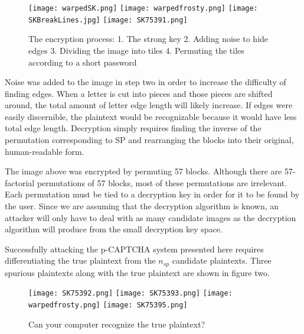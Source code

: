 \documentclass[12pt]{article}
\begin{document}
\begin{figure}
	\texttt{[image: warpedSK.png]}
	\texttt{[image: warpedfrosty.png]}
	\texttt{[image: SKBreakLines.jpg]}
	\texttt{[image: SK75391.png]}
	\caption{The encryption process: 1. The strong key 2. Adding noise to hide edges 3. Dividing the image into tiles 4. Permuting the tiles according to a short password}
\label{EncryptionProcess}
\end{figure}


	Noise was added to the image in step two in order to increase the difficulty of finding edges. When a letter is cut into pieces and those pieces are shifted around, the total amount of letter edge length will likely increase. If edges were easily discernible, the plaintext would be recognizable because it would have less total edge length. Decryption simply requires finding the inverse of the permutation corresponding to SP and rearranging the blocks into their original, human-readable form.

	The image above was encrypted by permuting 57 blocks. Although there are 57-factorial permutations of 57 blocks, most of these permutations are irrelevant. Each permutation must be tied to a decryption key in order for it to be found by the user. Since we are assuming that the decryption algorithm is known, an attacker will only have to deal with as many candidate images as the decryption algorithm will produce from the small decryption key space.

	Successfully attacking the p-CAPTCHA system presented here requires differentiating the true plaintext from the $n_{sp}$ candidate plaintexts. Three spurious plaintexts along with the true plaintext are shown in figure two.

\begin{figure}
	\texttt{[image: SK75392.png]}
	\texttt{[image: SK75393.png]}
	\texttt{[image: warpedfrosty.png]}
	\texttt{[image: SK75395.png]}
	\caption{Can your computer recognize the true plaintext?}
\label{RecognitionProblem}
\end{figure}
\end{document}
